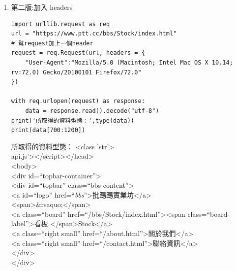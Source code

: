 \documentclass[a4paper,12pt]{article}
\begin{document}
\begin{enumerate}
\begin{enumerate}
\begin{enumerate}
\begin{enumerate}
\begin{lstlisting}
  with req.urlopen(url) as response:
      data = response.read().decode("utf-8")
  print(data)
\end{lstlisting}
\begin{itemize}
\item 被拒絕原因：這隻程式的行為不像一般使用者，被網站伺服器拒絕。403 Forbidden 是 HTTP 協議中的一個 \href{https://zh.wikipedia.org/zh-tw/HTTP\%E7\%8A\%B6\%E6\%80\%81\%E7\%A0\%81}{HTTP 狀態碼（Status Code）}。可以簡單的理解為沒有權限訪問此站，服務器收到請求但拒絕提供服務\footnote{\href{https://medium.com/ai\%E5\%8F\%8D\%E6\%96\%97\%E5\%9F\%8E/anaconda-miniconda-conda-pip\%E7\%9A\%84\%E7\%9B\%B8\%E4\%BA\%92\%E9\%97\%9C\%E4\%BF\%82-\%E8\%BD\%89\%E8\%BC\%89-a0536f3a257}{Anaconda、Miniconda、Conda、pip的相互關係 (轉載)}\\}。\\
\item urllib.request 是一個用來從 URLs (Uniform Resource Locators)取得資料的 Python 模\\
組。它提供一個了非常簡單的介面能接受多種不同的協議(protocol, 如 http, ftp)， urlopen 函數。\\
\end{itemize}
\item 第二版:加入 headers
\label{sec:org33dada0}
\lstset{breaklines=true,language=Python,label= ,caption= ,captionpos=b,numbers=none}
\begin{lstlisting}
import urllib.request as req
url = "https://www.ptt.cc/bbs/Stock/index.html"
# 幫request加上一個header
request = req.Request(url, headers = {
    "User-Agent":"Mozilla/5.0 (Macintosh; Intel Mac OS X 10.14; rv:72.0) Gecko/20100101 Firefox/72.0"
})

with req.urlopen(request) as response:
    data = response.read().decode("utf-8")
print('所取得的資料型態：',type(data))
print(data[700:1200])
\end{lstlisting}
\begin{results}
所取得的資料型態： <class 'str'>\\
api.js'></script></head>\\
    <body>\\

<div id=``topbar-container''>\\
	<div id=``topbar'' class=``bbs-content''>\\
		<a id=``logo'' href=``\emph{bbs}''>批踢踢實業坊</a>\\
		<span>\&rsaquo;</span>\\
		<a class=``board'' href=``/bbs/Stock/index.html''><span class=``board-label''>看板 </span>Stock</a>\\
		<a class=``right small'' href=``/about.html''>關於我們</a>\\
		<a class=``right small'' href=``/contact.html''>聯絡資訊</a>\\
	</div>\\
</div>\\


\end{results}
\end{enumerate}
\end{enumerate}
\end{enumerate}
\end{enumerate}
\end{document}
